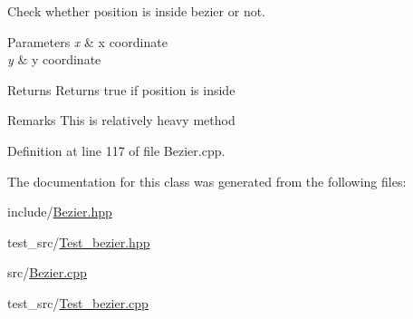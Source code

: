 Check whether position is inside bezier or not. 


\begin{DoxyParams}{Parameters}
{\em x} & x coordinate \\
\hline
{\em y} & y coordinate \\
\hline
\end{DoxyParams}
\begin{DoxyReturn}{Returns}
Returns true if position is inside 
\end{DoxyReturn}
\begin{DoxyRemark}{Remarks}
This is relatively heavy method 
\end{DoxyRemark}


Definition at line 117 of file Bezier.\+cpp.



The documentation for this class was generated from the following files\+:\begin{DoxyCompactItemize}
\item 
include/\mbox{\hyperlink{Bezier_8hpp}{Bezier.\+hpp}}\item 
test\+\_\+src/\mbox{\hyperlink{Test__bezier_8hpp}{Test\+\_\+bezier.\+hpp}}\item 
src/\mbox{\hyperlink{Bezier_8cpp}{Bezier.\+cpp}}\item 
test\+\_\+src/\mbox{\hyperlink{Test__bezier_8cpp}{Test\+\_\+bezier.\+cpp}}\end{DoxyCompactItemize}

